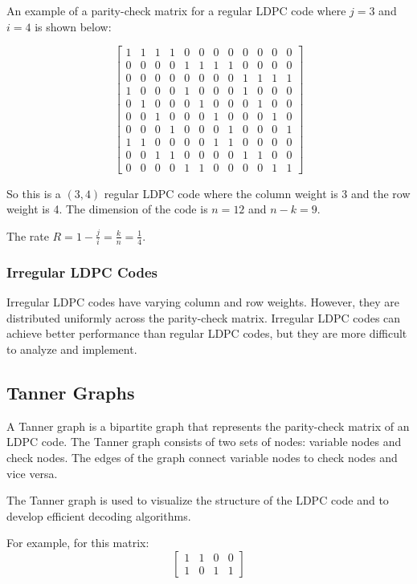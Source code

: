 \documentclass[conference]{IEEEtran}
\begin{document}
An example of a parity-check matrix for a regular LDPC code where $j=3$ and $i=4$ is shown below:

$$\begin{bmatrix}
  1 & 1 & 1 & 1 & 0 & 0 & 0 & 0 & 0 & 0 & 0 & 0\\
  0 & 0 & 0 & 0 & 1 & 1 & 1 & 1 & 0 & 0 & 0 & 0\\
  0 & 0 & 0 & 0 & 0 & 0 & 0 & 0 & 1 & 1 & 1 & 1\\
  1 & 0 & 0 & 0 & 1 & 0 & 0 & 0 & 1 & 0 & 0 & 0\\
  0 & 1 & 0 & 0 & 0 & 1 & 0 & 0 & 0 & 1 & 0 & 0\\
  0 & 0 & 1 & 0 & 0 & 0 & 1 & 0 & 0 & 0 & 1 & 0\\
  0 & 0 & 0 & 1 & 0 & 0 & 0 & 1 & 0 & 0 & 0 & 1\\
  1 & 1 & 0 & 0 & 0 & 0 & 1 & 1 & 0 & 0 & 0 & 0\\
  0 & 0 & 1 & 1 & 0 & 0 & 0 & 0 & 1 & 1 & 0 & 0\\
  0 & 0 & 0 & 0 & 1 & 1 & 0 & 0 & 0 & 0 & 1 & 1
\end{bmatrix}$$

So this is a $(3,4)$ regular LDPC code where the column weight is 3 and the row weight is 4. The dimension of the code is $n=12$ and $n-k=9$.

The rate $R=1-\frac{j}{i}=\frac{k}{n}=\frac{1}{4}$.

\subsubsection{Irregular LDPC Codes}
Irregular LDPC codes have varying column and row weights.
However, they are distributed uniformly across the parity-check matrix.
Irregular LDPC codes can achieve better performance than regular LDPC codes, but they are more difficult to analyze and implement.

\subsection{Tanner Graphs}
A Tanner graph is a bipartite graph that represents the parity-check matrix of an LDPC code. The Tanner graph consists of two sets of nodes: variable nodes and check nodes. The edges of the graph connect variable nodes to check nodes and vice versa.

The Tanner graph is used to visualize the structure of the LDPC code and to develop efficient decoding algorithms.

For example, for this matrix: \[
    \begin{bmatrix}
        1 & 1 & 0 & 0\\
        1 & 0 & 1 & 1
    \end{bmatrix}
\]
\end{document}
